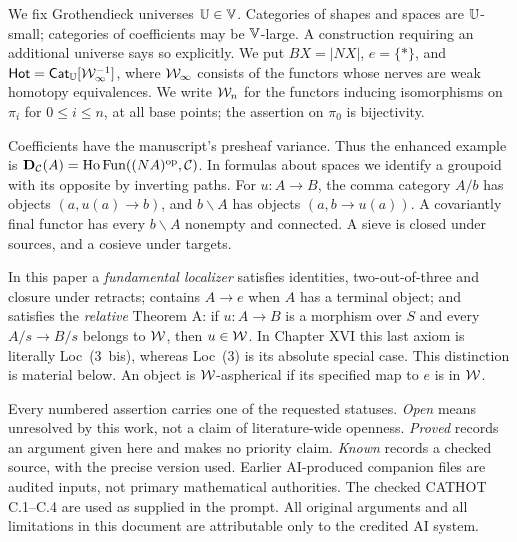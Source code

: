 We fix Grothendieck universes $\mathbb U\in\mathbb V$. Categories of shapes and spaces are
$\mathbb U$-small; categories of coefficients may be $\mathbb V$-large. A construction
requiring an additional universe says so explicitly. We put
$BX=|NX|$, $e=\{*\}$, and
$\mathsf{Hot}=\mathsf{Cat}_{\mathbb U}[\mathcal W_{\infty}^{-1}]$, where $\mathcal W_{\infty}$ consists of the
functors whose nerves are weak homotopy equivalences. We write $\mathcal W_n$
for the functors inducing isomorphisms on $\pi_i$ for $0\leq i\leq n$,
at all base points; the assertion on $\pi_0$ is bijectivity.

Coefficients have the manuscript's presheaf variance. Thus the enhanced
example is $\mathbf D_{\mathcal C}(A)=\operatorname{Ho}\operatorname{Fun}((NA)^{\mathrm{op}},\mathcal C)$.
In formulas about spaces we identify a groupoid with its opposite by
inverting paths. For $u:A\to B$, the comma category $A/b$ has objects
$(a,u(a)\to b)$, and $b\backslash A$ has objects $(a,b\to u(a))$.
A covariantly final functor has every $b\backslash A$ nonempty and
connected. A sieve is closed under sources, and a cosieve under targets.

In this paper a \emph{fundamental localizer} satisfies identities,
two-out-of-three and closure under retracts; contains $A\to e$ when
$A$ has a terminal object; and satisfies the \emph{relative} Theorem A:
if $u:A\to B$ is a morphism over $S$ and every $A/s\to B/s$ belongs
to $\mathcal W$, then $u\in\mathcal W$. In Chapter XVI this last axiom is literally
Loc~(3~bis), whereas Loc~(3) is its absolute special case. This distinction
is material below. An object is $\mathcal W$-aspherical if its specified map to
$e$ is in $\mathcal W$.

Every numbered assertion carries one of the requested statuses.
\emph{Open} means unresolved by this work, not a claim of literature-wide
openness. \emph{Proved} records an argument given here and makes no
priority claim. \emph{Known} records a checked source, with the precise
version used. Earlier AI-produced companion files are audited inputs,
not primary mathematical authorities. The checked CATHOT C.1--C.4 are
used as supplied in the prompt. All original arguments and all limitations
in this document are attributable only to the credited AI system.
